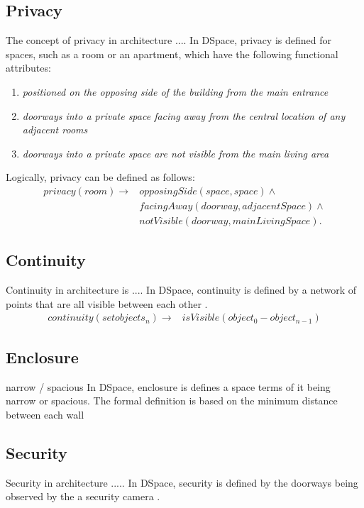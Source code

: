 \documentclass[12pt]{ucthesis}
\begin{document}
\subsection{Privacy}
The concept of privacy in architecture .... 
In DSpace, privacy is defined for spaces, such as a room or an apartment, which have the following functional attributes:
\begin{enumerate}
\item \emph{positioned on the opposing side of the building from the main entrance}
\item \emph{doorways into a private space facing away from the central location of any adjacent rooms}
\item \emph{doorways into a private space are not visible from the main living area}
\end{enumerate} 

Logically, privacy can be defined as follows:
\begin{equation} 
\begin{split}
privacy(room) \rightarrow & opposingSide(space, space) \wedge \\
                          & facingAway(doorway, adjacentSpace) \wedge \\
                          & notVisible(doorway, mainLivingSpace	).
\end{split}
\end{equation}	


\subsection{Continuity}
Continuity in architecture is ....
In DSpace, continuity is defined by a network of points that are all visible between each other \cite{Key}. 
\begin{equation}
\begin{split}
continuity(setobjects_{n}) \rightarrow &isVisible(object_{0} - object_{n-1})
\end{split}
\end{equation}


\subsection{Enclosure} narrow / spacious
In DSpace, enclosure is defines a space terms of it being narrow or spacious. The formal definition is based on the minimum distance between each wall \cite{Key} 

\subsection{Security}
Security in architecture .....
In DSpace, security is defined by the doorways being observed by the a security camera \cite{Bhatt}. 
\end{document}
